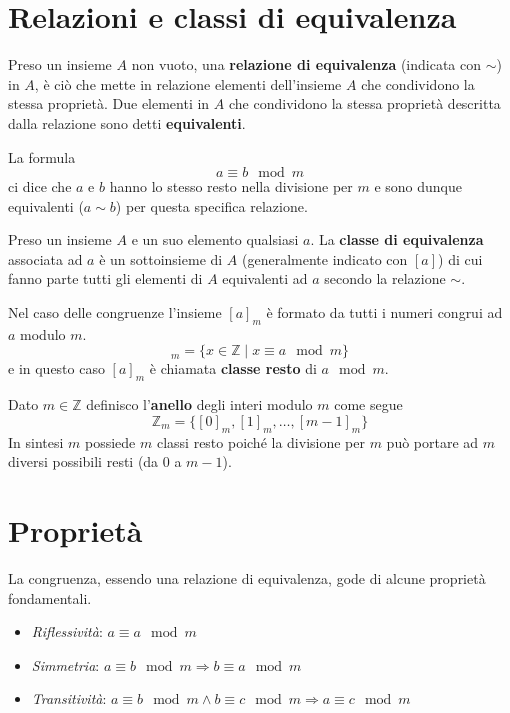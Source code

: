 \section{Relazioni e classi di equivalenza}

\begin{definition}
	Preso un insieme $A$ non vuoto, una \textbf{relazione di equivalenza} (indicata con $\sim$) in $A$,
	\`e ci\`o che mette in relazione elementi dell'insieme $A$ che condividono la stessa propriet\`a.
	Due elementi in $A$ che condividono la stessa propriet\`a descritta dalla relazione sono detti
	\textbf{equivalenti}.
\end{definition}

La formula
\begin{equation*}
	a \equiv b \mod{m}
\end{equation*}
ci dice che $a$ e $b$ hanno lo stesso resto nella divisione per $m$ e sono dunque
equivalenti ($a \sim b$) per questa specifica relazione.

\begin{definition}
	Preso un insieme $A$ e un suo elemento qualsiasi $a$. La \textbf{classe di equivalenza} associata
	ad $a$ \`e un sottoinsieme di $A$ (generalmente indicato con $[a]$) di cui fanno parte tutti gli
	elementi di $A$ equivalenti ad $a$ secondo la relazione $\sim$.
\end{definition}

Nel caso delle congruenze l'insieme $[a]_m$ \`e formato da tutti i numeri congrui ad $a$ modulo $m$.
\begin{equation*}
	[a]_m = \{ x \in \mathbb{Z} \mid x \equiv a \mod{m} \}
\end{equation*}
e in questo caso $[a]_m$ \`e chiamata \textbf{classe resto} di $a \mod{m}$.

\begin{definition}
	Dato $m \in \mathbb{Z}$ definisco l'\textbf{anello} degli interi modulo $m$ come segue
	\begin{equation*}
		\mathbb{Z}_m = \{ [0]_m, [1]_m, \dots, [m - 1]_m \}
	\end{equation*}
	In sintesi $m$ possiede $m$ classi resto poich\'e la divisione per $m$ pu\`o portare ad $m$ diversi
	possibili resti (da 0 a $m - 1$).
\end{definition}

\section{Propriet\`a}
La congruenza, essendo una relazione di equivalenza, gode di alcune propriet\`a fondamentali.
\begin{itemize}
	\item \emph{Riflessivit\`a}: $a \equiv a \mod{m}$
	\item \emph{Simmetria}: $a \equiv b \mod{m} \Rightarrow b \equiv a \mod{m}$
	\item \emph{Transitivit\`a}: $a \equiv b \mod{m} \wedge b \equiv c \mod{m} \Rightarrow
		      a \equiv c \mod{m}$
\end{itemize}

